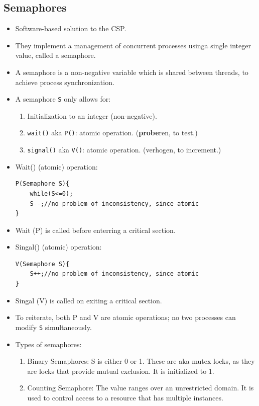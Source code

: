 \documentclass[10pt]{report}
\begin{document}
\subsection{Semaphores}
\begin{itemize}
\item Software-based solution to the CSP.
\item They implement a management of concurrent processes usinga single integer value, called a semaphore.
\item A semaphore is a non-negative variable which is shared between threads, to achieve process synchronization.
\item A semaphore \texttt{S} only allows for:
\begin{enumerate}
\item Initialization to an integer (non-negative).
\item \texttt{wait()} aka \texttt{P()}: atomic operation. (\textbf{probe}ren, to test.)
\item \texttt{signal()} aka \texttt{V()}: atomic operation. (verhogen, to increment.)
\end{enumerate}
\item Wait() (atomic) operation:
\begin{lstlisting}
P(Semaphore S){
    while(S<=0);
    S--;//no problem of inconsistency, since atomic
}
\end{lstlisting}
\item Wait (P) is called before enterring a critical section.
\item Singal() (atomic) operation:
\begin{lstlisting}
V(Semaphore S){
    S++;//no problem of inconsistency, since atomic
}
\end{lstlisting}
\item Singal (V) is called on exiting a critical section.
\item To reiterate, both P and V are atomic operations; no two processes can modify \texttt{S} simultaneously.
\item Types of semaphores:
\begin{enumerate}
\item Binary Semaphores: S is either 0 or 1. These are aka mutex locks, as they are locks that provide mutual exclusion. It is initialized to 1.
\item Counting Semaphore: The value ranges over an unrestricted domain. It is used to control access to a resource that has multiple instances.
\end{enumerate}
\end{itemize}
\end{document}
